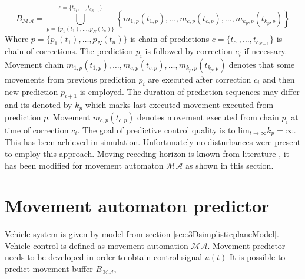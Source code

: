 \begin{equation}
    B_{\mathscr{MA}} = \bigcup_{p=\{p_1(t_1),\dots,p_N(t_n)\}}^{c=\{t_{c_1},\dots,t_{c_{N-1}}\}} \left\{m_{1,p}(t_{1,p}),\dots,m_{c,p}(t_{c,p}),\dots,m_{k_p,p}(t_{k_p,p})\right\}
\end{equation}
\noindent Where $p=\{p_1(t_1),\dots,p_N(t_n)\}$ is chain of predictions $c=\{t_{c_1},\dots,t_{c_{N-1}}\}$ is chain of corrections. The prediction $p_i$ is followed by correction $c_i$ if necessary. Movement chain $m_{1,p}(t_{1,p}),\dots,m_{c,p}(t_{c,p}),\dots,m_{k_p,p}(t_{k_p,p})$ denotes that some movements from previous prediction $p_i$ are executed after correction $c_i$ and then new prediction $p_{i+1}$ is employed. The duration of prediction sequences may differ and its denoted by $k_p$ which marks last executed movement executed from prediction $p$. Movement $m_{c,p}(t_{c,p})$ denotes movement executed from chain $p_i$ at time of correction $c_i$. The goal of predictive control quality is to $\text{lim}_{t\to\infty} k_p = \infty$. This has been achieved in simulation. Unfortunately no disturbances were present to employ this approach. Moving receding horizon is known from literature \cite{rawlings1993stability}, it has been modified for movement automaton $\mathscr{MA}$ as shown in this section.

\section{Movement automaton predictor}\label{ch:movementAutomatonPredictor}
\noindent Vehicle system is given by model from section \ref{sec:3DsimplisticplaneModel}. Vehicle control is defined as movement automation $\mathscr{MA}$.  Movement predictor needs to be developed in order to obtain control signal $u(t)$ It is possible to predict movement buffer $B_{\mathscr{MA}}$, 

